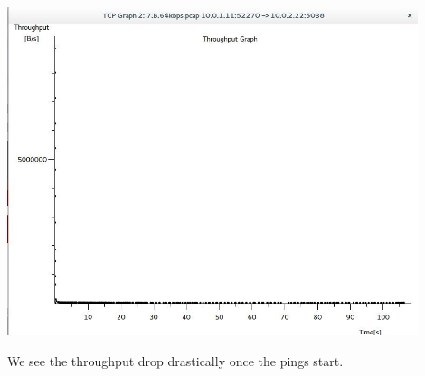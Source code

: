 \begin{center}

\includegraphics[width=0.9\textwidth]{images/7_B_throughput.jpg}

\end{center}

We see the throughput drop drastically once the pings start.